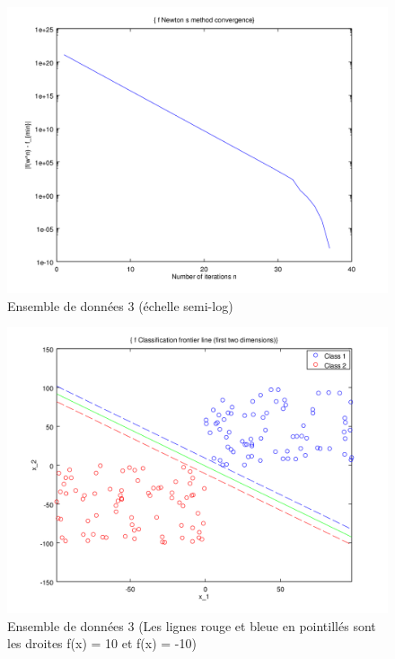 \documentclass{article}
\begin{document}
         \begin{figure}[H]
           \begin{center}
             \includegraphics[scale=0.5]{images/cvnewton3.png}
             \caption{Ensemble de données 3 (échelle semi-log)}
           \end{center}
         \end{figure}

         \begin{figure}[H]
           \begin{center}
             \includegraphics[scale=0.5]{images/line3.png}
             \caption{Ensemble de données 3 (Les lignes rouge et bleue en pointillés sont les droites f(x) = 10 et f(x) = -10)}
           \end{center}
         \end{figure}
\end{document}
